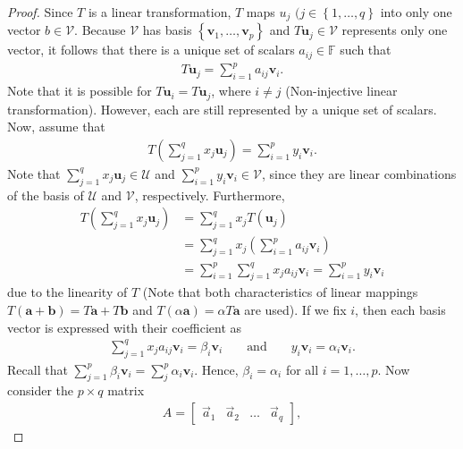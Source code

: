 \documentclass[12pt]{article}
\begin{document}
\begin{proof}
  Since $T$ is a linear transformation, $T$ maps $u_{j}$ $(j\in \left\{ 1,\dots,q \right\}$ into only one vector $b\in \mathcal{V}$. Because $\mathcal{V}$ has basis $\left\{ \mathbf{v}_{1},\dots,\mathbf{v}_{p} \right\}$ and $T\mathbf{u}_{j}\in \mathcal{V}$ represents only one vector, it follows that there is a unique set of scalars $a_{ij}\in \mathbb{F}$ such that  
\begin{align*}
  T\mathbf{u}_{j} = \sum_{i=1}^{p}a_{ij}\mathbf{v}_{i}.
\end{align*}
Note that it is possible for $T\mathbf{u}_{i} = T\mathbf{u}_{j}$, where $i\neq j$ (Non-injective linear transformation). However, each are still represented by a unique set of scalars. Now, assume that  
\begin{align*}
  T\left( \sum_{j=1}^{q}x_{j}\mathbf{u}_{j} \right) = \sum_{i=1}^{p}y_{i}\mathbf{v}_{i}.
\end{align*}
Note that $\sum_{j=1}^{q}x_{j}\mathbf{u}_{j} \in \mathcal{U}$ and $\sum_{i=1}^{p}y_{i}\mathbf{v}_{i} \in \mathcal{V}$, since they are linear combinations of the basis of $\mathcal{U}$ and $\mathcal{V}$, respectively. Furthermore,
\begin{align*}
  T\left( \sum_{j=1}^{q}x_{j}\mathbf{u}_{j} \right) &= \sum_{j=1}^{q}x_{j}T(\mathbf{u}_{j}) \\
  &= \sum_{j=1}^{q}x_{j}\left( \sum_{i=1}^{p}a_{ij}\mathbf{v}_{i} \right)\\
  &= \sum_{i=1}^{p}\sum_{j=1}^{q}x_{j}a_{ij}\mathbf{v}_{i}
  = \sum_{i=1}^{p}y_{i}\mathbf{v}_{i}
\end{align*}
due to the linearity of  $T$ (Note that both characteristics of linear mappings $T(\mathbf{a}+\mathbf{b}) = T\mathbf{a} + T\mathbf{b}$ and $T(\alpha\mathbf{a}) = \alpha T\mathbf{a}$ are used). If we fix $i$, then each basis vector is expressed with their coefficient as
\begin{align*}
  \sum_{j=1}^{q}x_{j}a_{ij} \mathbf{v}_{i} = \beta_{i}\mathbf{v}_{i}& &\text{ and }& &y_{i} \mathbf{v}_{i}=\alpha_{i}\mathbf{v}_{i}.
\end{align*}
Recall that $\sum_{j=1}^{p} \beta_{i}\mathbf{v}_{i} = \sum_{j}^{p} \alpha_{i}\mathbf{v}_{i}$. Hence, $\beta_{i} = \alpha_{i}$ for all $i=1,\dots,p$.
Now consider the $p\times q$ matrix
\begin{align*}
  A = 
\begin{bmatrix}
  \vec{a}_{1} &  \vec{a}_{2} & \ldots & \vec{a}_{q}
\end{bmatrix},
\end{align*}

\end{proof}
\end{document}
